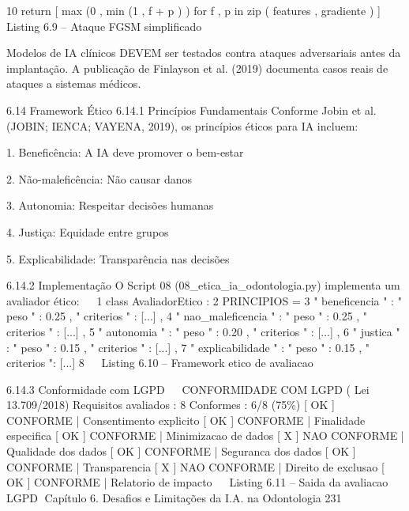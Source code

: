 10        return [ max (0 , min (1 , f + p ) ) for f , p in zip ( features , gradiente ) ]
                                                                                                  
                               Listing 6.9 – Ataque FGSM simplificado


         Modelos de IA clínicos DEVEM ser testados contra ataques adversariais antes
         da implantação. A publicação de Finlayson et al. (2019) documenta casos reais
         de ataques a sistemas médicos.


     6.14       Framework Ético
     6.14.1     Princípios Fundamentais
     Conforme Jobin et al. (JOBIN; IENCA; VAYENA, 2019), os princípios éticos para IA
     incluem:

         1. Beneficência: A IA deve promover o bem-estar

         2. Não-maleficência: Não causar danos

         3. Autonomia: Respeitar decisões humanas

         4. Justiça: Equidade entre grupos

         5. Explicabilidade: Transparência nas decisões

     6.14.2     Implementação
     O Script 08 (08_etica_ia_odontologia.py) implementa um avaliador ético:
                                                                                                  
 1 class AvaliadorEtico :
 2     PRINCIPIOS = {
 3         " beneficencia " : { " peso " : 0.25 , " criterios " : [...]} ,
 4         " nao_maleficencia " : { " peso " : 0.25 , " criterios " : [...]} ,
 5         " autonomia " : { " peso " : 0.20 , " criterios " : [...]} ,
 6         " justica " : { " peso " : 0.15 , " criterios " : [...]} ,
 7         " explicabilidade " : { " peso " : 0.15 , " criterios ": [...]}
 8     }
                                                                                                  
                             Listing 6.10 – Framework etico de avaliacao


     6.14.3     Conformidade com LGPD
                                                                                                  
     CONFORMIDADE COM LGPD ( Lei 13.709/2018)
     Requisitos avaliados : 8
     Conformes : 6/8 (75\%)
       [ OK ] CONFORME | Consentimento explicito
       [ OK ] CONFORME | Finalidade especifica
       [ OK ] CONFORME | Minimizacao de dados
       [ X ] NAO CONFORME | Qualidade dos dados
       [ OK ] CONFORME | Seguranca dos dados
       [ OK ] CONFORME | Transparencia
       [ X ] NAO CONFORME | Direito de exclusao
       [ OK ] CONFORME | Relatorio de impacto
                                                                                                  
                               Listing 6.11 – Saida da avaliacao LGPD
Capítulo 6. Desafios e Limitações da I.A. na Odontologia                      231


